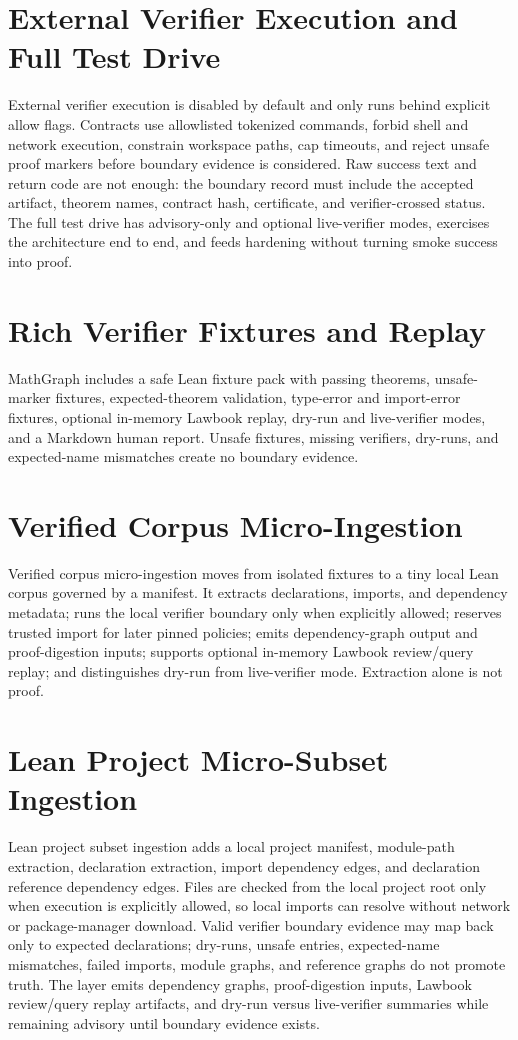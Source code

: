 \documentclass[11pt,a4paper]{article}
\begin{document}
\section{External Verifier Execution and Full Test Drive}
External verifier execution is disabled by default and only runs behind explicit allow flags. Contracts use allowlisted tokenized commands, forbid shell and network execution, constrain workspace paths, cap timeouts, and reject unsafe proof markers before boundary evidence is considered. Raw success text and return code are not enough: the boundary record must include the accepted artifact, theorem names, contract hash, certificate, and verifier-crossed status. The full test drive has advisory-only and optional live-verifier modes, exercises the architecture end to end, and feeds hardening without turning smoke success into proof.

\section{Rich Verifier Fixtures and Replay}
MathGraph includes a safe Lean fixture pack with passing theorems, unsafe-marker fixtures, expected-theorem validation, type-error and import-error fixtures, optional in-memory Lawbook replay, dry-run and live-verifier modes, and a Markdown human report. Unsafe fixtures, missing verifiers, dry-runs, and expected-name mismatches create no boundary evidence.

\section{Verified Corpus Micro-Ingestion}
Verified corpus micro-ingestion moves from isolated fixtures to a tiny local Lean corpus governed by a manifest. It extracts declarations, imports, and dependency metadata; runs the local verifier boundary only when explicitly allowed; reserves trusted import for later pinned policies; emits dependency-graph output and proof-digestion inputs; supports optional in-memory Lawbook review/query replay; and distinguishes dry-run from live-verifier mode. Extraction alone is not proof.

\section{Lean Project Micro-Subset Ingestion}
Lean project subset ingestion adds a local project manifest, module-path
extraction, declaration extraction, import dependency edges, and declaration
reference dependency edges. Files are checked from the local project root only
when execution is explicitly allowed, so local imports can resolve without
network or package-manager download. Valid verifier boundary evidence may map
back only to expected declarations; dry-runs, unsafe entries, expected-name
mismatches, failed imports, module graphs, and reference graphs do not promote
truth. The layer emits dependency graphs, proof-digestion inputs, Lawbook
review/query replay artifacts, and dry-run versus live-verifier summaries while
remaining advisory until boundary evidence exists.
\end{document}
